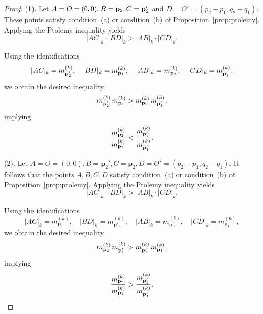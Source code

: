 \documentclass{article}
\theoremstyle{remark}
\begin{document}
\begin{proof}
(1). Let $A=O=(0,0), B={\bf p}_2, C={\bf p}'_2$ and $D=O'=(p_2-p_1,q_2-q_1)$. These points satisfy condition~(a) or condition~(b) of Proposition~\ref{prop:ptolemy}.  
Applying the Ptolemy inequality yields
\[
    |AC|_k \cdot |BD|_k > |AB|_k \cdot |CD|_k.
\]

Using the identifications
\[
    |AC|_k = m^{(k)}_{{\bf p}'_2}, \quad 
    |BD|_k = m^{(k)}_{{\bf p}_1}, \quad 
    |AB|_k = m^{(k)}_{{\bf p}_2}, \quad 
    |CD|_k = m^{(k)}_{{\bf p}'_1},
\]
we obtain the desired inequality
\[
    m^{(k)}_{{\bf p}'_2} \, m^{(k)}_{{\bf p}_1} 
    > 
   m^{(k)}_{{\bf p}_2} \, m^{(k)}_{{\bf p}'_1},
\]
implying 
\[
    \frac{m^{(k)}_{{\bf p}_2}}{m^{(k)}_{{\bf p}_1}} 
    < 
    \frac{m^{(k)}_{{\bf p}'_2}}{m^{(k)}_{{\bf p}'_1}}.
    \]

(2). Let $A=O=(0,0), B=\mathbf{p}_2', C=\mathbf{p}_2, D=O'=(p_2-p_1,q_2-q_1)$. It follows that the points $A,B,C,D$ satisfy condition~(a) or condition~(b) of Proposition~\ref{prop:ptolemy}.  
Applying the Ptolemy inequality yields
\[
    |AC|_k \cdot |BD|_k > |AB|_k \cdot |CD|_k.
\]

Using the identifications
\[
    |AC|_k = m^{(k)}_{\mathbf{p}_2}, \quad 
    |BD|_k = m^{(k)}_{\mathbf{p}'_1}, \quad 
    |AB|_k = m^{(k)}_{\mathbf{p}'_2}, \quad 
    |CD|_k = m^{(k)}_{\mathbf{p}_1},
\]
we obtain the desired inequality
\[
    m^{(k)}_{{\bf p}_2} \, m^{(k)}_{{\bf p}'_1} 
    > 
   m^{(k)}_{{\bf p}'_2} \, m^{(k)}_{{\bf p}_1},
\]
implying
\[
    \frac{m^{(k)}_{{\bf p}_2}}{m^{(k)}_{{\bf p}_1}} 
    >
    \frac{m^{(k)}_{{\bf p}'_2}}{m^{(k)}_{{\bf p}'_1}}.
    \]
\end{proof}
\end{document}
